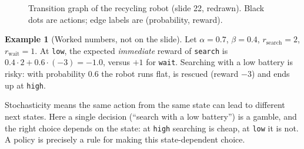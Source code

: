 \documentclass[11pt,a4paper]{article}
\theoremstyle{plain}
\theoremstyle{definition}
\newtheorem{example}[theorem]{Example}
\theoremstyle{remark}
\begin{document}
\begin{figure}[htbp]
\centering
{}
\caption{Transition graph of the recycling robot (slide 22, redrawn). Black dots are actions; edge labels are (probability, reward).}
\end{figure}

\begin{example}[Worked numbers, not on the slide]
Let $\alpha=0.7$, $\beta=0.4$, $r_{\text{search}}=2$, $r_{\text{wait}}=1$. At \texttt{low}, the expected \emph{immediate} reward of \texttt{search} is $0.4\cdot2+0.6\cdot(-3)=-1.0$, versus $+1$ for \texttt{wait}. Searching with a low battery is risky: with probability $0.6$ the robot runs flat, is rescued (reward $-3$) and ends up at \texttt{high}.
\end{example}

\begin{intuition}
Stochasticity means the same action from the same state can lead to different next states. Here a single decision (``search with a low battery'') is a gamble, and the right choice depends on the state: at \texttt{high} searching is cheap, at \texttt{low} it is not. A policy is precisely a rule for making this state-dependent choice.
\end{intuition}
\end{document}
